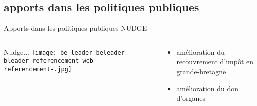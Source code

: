 \documentclass[serif]{beamer}
\begin{document}
\subsection{apports dans les politiques publiques}
\begin{frame}{Apports dans les politiques publiques-NUDGE}
\begin{columns}
 
\begin{column}{0.3\textwidth}
Nudge... 
\texttt{[image: be-leader-beleader-bleader-referencement-web-referencement-.jpg]} 
\end{column}
\hspace{1cm}     \mbox{ }
\begin{column}{0.6\textwidth}
\begin{block}{}
\begin{itemize}
\item[\ding{52}] amélioration du recouvrement d'impôt en grande-bretagne
\item[\ding{52}] amélioration du don d'organes

\end{itemize}
\end{block}
\end{column}
\end{columns}
\end{frame}
\end{document}
